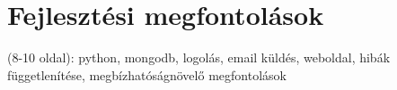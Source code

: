 
\section{Fejlesztési megfontolások}
(8-10 oldal): python, mongodb, logolás, email küldés, weboldal, hibák függetlenítése, megbízhatóságnövelő megfontolások